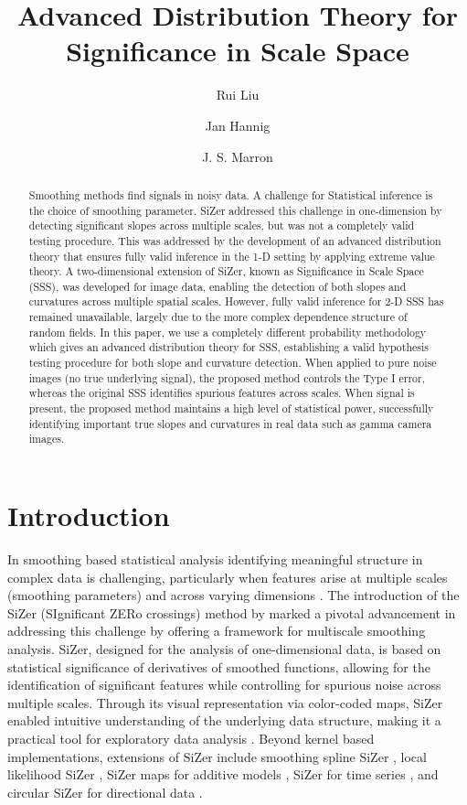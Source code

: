 \documentclass{article}
\title{Advanced Distribution Theory for Significance in Scale Space}
\date{}
\author[1]{Rui Liu }
\author[1]{Jan Hannig}
\author[1,2]{J. S. Marron}
\affil[1]{Department of Statistics and Operations Research,  The University of North Carolina at Chapel Hill}
\affil[2]{School of Data Science and Society,  The University of North Carolina at Chapel Hill}
\begin{document}
\maketitle
\begin{abstract}
	Smoothing methods find signals in noisy data. A challenge for Statistical inference is the choice of smoothing parameter. SiZer addressed this challenge in one-dimension by detecting significant slopes across multiple scales, but was not a completely valid testing procedure. This was addressed by the development of an advanced distribution theory that ensures fully valid inference in the 1-D setting by applying extreme value theory. A two-dimensional extension of SiZer, known as Significance in Scale Space (SSS), was developed for image data, enabling the detection of both slopes and curvatures across multiple spatial scales. However, fully valid inference for 2-D SSS has remained unavailable, largely due to the more complex dependence structure of random fields. In this paper, we use a completely different probability methodology which gives an advanced distribution theory for SSS, establishing a valid hypothesis testing procedure for both slope and curvature detection. When applied to pure noise images (no true underlying signal), the proposed method  controls the Type I error, whereas the original SSS identifies spurious features across scales. When signal is present, the proposed method maintains a  high level of statistical power, successfully identifying important true slopes and curvatures in real data such as gamma camera images.
	
\end{abstract}



\section{Introduction}

In smoothing based statistical analysis identifying meaningful structure in complex data is challenging, particularly when features arise at multiple scales (smoothing parameters) and across varying dimensions \citep{lindeberg2013scale}.  The introduction of the SiZer (SIgnificant ZERo crossings) method by \citet{chaudhuri1999sizer} marked a pivotal advancement in addressing this challenge by offering a framework for multiscale smoothing analysis. SiZer, designed for the analysis of one-dimensional data, is based on statistical significance of derivatives of smoothed functions, allowing for the identification of significant features while controlling for spurious noise across multiple scales. Through its visual representation via color-coded maps, SiZer enabled intuitive understanding of the underlying data structure, making it a practical tool for exploratory data analysis \citep{chaudhuri2000scale}. Beyond kernel based implementations, extensions of SiZer include smoothing spline SiZer \citep{zhang2004simple, marron2005sizer}, local likelihood SiZer \citep{li2005local}, SiZer maps for additive models \citep{gonzalez2008sizer, martinez2005sizer}, SiZer for time series \citep{park2004dependent,rondonotti2007sizer,park2009improved,park2009sizer}, and circular SiZer for directional data \citep{oliveira2014circsizer,huckemann2016circular}. 
\end{document}
